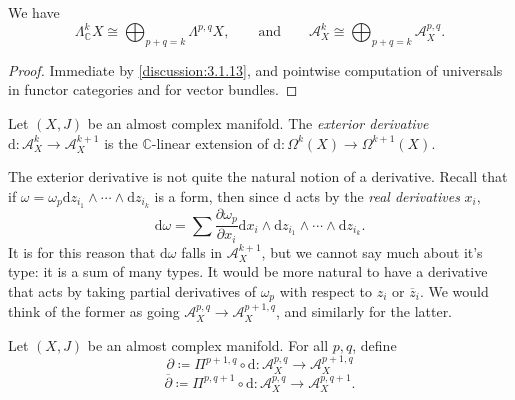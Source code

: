 \begin{corollary}\label{cor:3.2.10}
	We have
	\[
		\Lambda _\mathbb{C} ^kX \cong \bigoplus_{p+q=k} \Lambda ^{p,q} X,\qquad \text{and} \qquad \mathcal{A} ^k_X \cong \bigoplus_{p+q=k} \mathcal{A} ^{p,q}_X
	.\]
\end{corollary}
\begin{proof}
	Immediate by \cref{discussion:3.1.13}, and pointwise computation of universals in functor categories and for vector bundles.
\end{proof}

\begin{definition}\label{dfn:3.2.11}
	Let $(X,J)$ be an almost complex manifold. The \emph{exterior derivative} $\mathrm{d} : \mathcal{A} ^k_X \to \mathcal{A} ^{k+1} _X$ is the $\mathbb{C} $-linear extension of $\mathrm{d} : \Omega ^k(X) \to \Omega ^{k+1} (X)$.
\end{definition}

\begin{discussion}\label{discussion:3.2.12}
	The exterior derivative is not quite the natural notion of a derivative. Recall that if $\omega =\omega _p \mathrm{d} z_{i_1} \wedge \cdots \wedge \mathrm{d} z_{i_k} $ is a form, then since $\mathrm{d} $ acts by the \emph{real derivatives} $x_i$,
	\[
		\mathrm{d} \omega  = \sum \frac{\partial \omega_p}{\partial x_i} \mathrm{d} x_i \wedge \mathrm{d} z_{i_1} \wedge \cdots \wedge \mathrm{d} z_{i_k} 
	.\]
	It is for this reason that $\mathrm{d} \omega $ falls in $\mathcal{A} ^{k+1} _X$, but we cannot say much about it's type: it is a sum of many types. It would be more natural to have a derivative that acts by taking partial derivatives of $\omega _p$ with respect to $z_i$ or $\overline{z} _i$. We would think of the former as going $\mathcal{A}^{p,q}_X \to \mathcal{A} ^{p+1,q} _X$, and similarly for the latter.
\end{discussion}

\begin{definition}\label{dfn:3.2.13}
	Let $(X,J)$ be an almost complex manifold. For all $p,q$, define
	\[
		\partial \coloneqq \Pi ^{p+1,q} \circ \mathrm{d} : \mathcal{A} ^{p,q}_X \to \mathcal{A} ^{p+1,q} _X
	\]
	\[
		\overline{\partial } \coloneqq \Pi ^{p,q+1} \circ \mathrm{d} : \mathcal{A} ^{p,q} _X \to \mathcal{A} ^{p,q+1} _X
	.\]
\end{definition}

